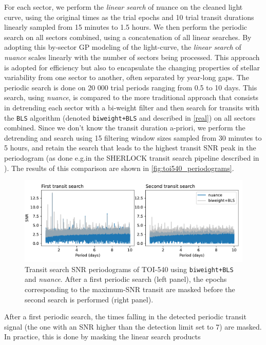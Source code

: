 \documentclass[modern]{aastex631}
\newcommand{\nuancemethod}{\textit{nuance}}
\newcommand{\nuance}{\nuancemethod{}}
\begin{document}
For each sector, we perform the \textit{linear search} of nuance on the cleaned light curve, using the original times as the trial epochs and 10 trial transit durations linearly sampled from 15 minutes to 1.5 hours. We then perform the periodic search on all sectors combined, using a concatenation of all linear searches. By adopting this by-sector GP modeling of the light-curve, the \textit{linear search} of \nuance{} scales linearly with the number of sectors being processed. This approach is adopted for efficiency but also to encapsulate the changing properties of stellar variability from one sector to another, often separated by year-long gaps. The periodic search is done on 20 000 trial periods ranging from 0.5 to 10 days. This search, using \nuance{}, is compared to the more traditional approach that consists in detrending each sector with a bi-weight filter and then search for transits with the \texttt{BLS} algorithm (denoted \texttt{biweight+BLS} and described in \autoref{real}) on all sectors combined. Since we don't know the transit duration a-priori, we perform the detrending and search using 15 filtering window sizes sampled from 30 minutes to 5 hours, and retain the search that leads to the highest transit SNR peak in the periodogram (as done e.g.\;in the SHERLOCK transit search pipeline described in \citealt{Pozuelos2020}). The results of this comparison are shown in \autoref{fig:toi540_periodograms}.
\begin{figure}[H]
    \begin{centering}
        \includegraphics[width=\linewidth]{../workflows/comparison_toi/figures/TOI 540/periodograms.pdf} 
        \caption{Transit search SNR periodograms of TOI-540 using \texttt{biweight+BLS} and \nuance{}. After a first periodic search (left panel), the epochs corresponding to the maximum-SNR transit are masked before the second search is performed (right panel).}
        \label{fig:toi540_periodograms}
    \end{centering}
\end{figure}
After a first periodic search, the times falling in the detected periodic transit signal (the one with an SNR higher than the detection limit set to 7) are masked. In practice, this is done by masking the linear search products \\\\
\end{document}
